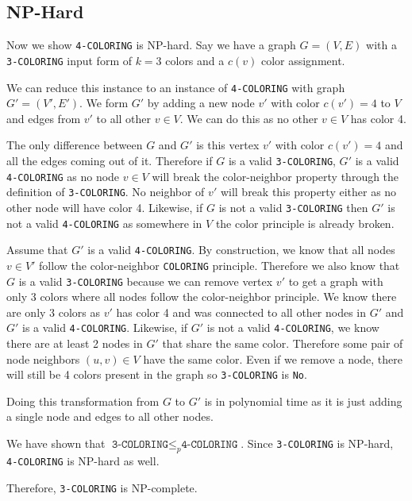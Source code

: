 \documentclass{article}
\begin{document}
\subsection{NP-Hard}
Now we show \texttt{4-COLORING} is NP-hard.
Say we have a graph $G = (V, E)$ with a \texttt{3-COLORING} input form of $k=3$ colors and a $c(v)$ color assignment.

We can reduce this instance to an instance of \texttt{4-COLORING} with graph $G' = (V', E')$.
We form $G'$ by adding a new node $v'$ with color $c(v') = 4$ to $V$ and edges from $v'$ to all other $v \in V$. We can do this as no other $v \in V$ has color 4.

The only difference between $G$ and $G'$ is this vertex $v'$ with color $c(v') = 4$ and all the edges coming out of it. 
Therefore if $G$ is a valid \texttt{3-COLORING}, $G'$ is a valid \texttt{4-COLORING} as no node $v \in V$ will break the color-neighbor property through the definition of \texttt{3-COLORING}.
No neighbor of $v'$ will break this property either as no other node will have color 4.
Likewise, if $G$ is not a valid \texttt{3-COLORING} then $G'$ is not a valid \texttt{4-COLORING} as somewhere in $V$ the color principle is already broken.

Assume that $G'$ is a valid \texttt{4-COLORING}. By construction, we know that all nodes $v \in V'$ follow the color-neighbor \texttt{COLORING} principle. 
Therefore we also know that $G$ is a valid \texttt{3-COLORING} because we can remove vertex $v'$ to get a graph with only 3 colors where all nodes follow the color-neighbor principle.
We know there are only 3 colors as $v'$ has color 4 and was connected to all other nodes in $G'$ and $G'$ is a valid \texttt{4-COLORING}.
Likewise, if $G'$ is not a valid \texttt{4-COLORING}, we know there are at least 2 nodes in $G'$ that share the same color.
Therefore some pair of node neighbors $(u, v) \in V$ have the same color. Even if we remove a node, there will still be 4 colors present in the graph so \texttt{3-COLORING} is \texttt{No}. 

Doing this transformation from $G$ to $G'$ is in polynomial time as it is just adding a single node and edges to all other nodes.

We have shown that $\texttt{3-COLORING} \leq_p \texttt{4-COLORING}$. Since \texttt{3-COLORING} is NP-hard, \texttt{4-COLORING} is NP-hard as well.

Therefore, \texttt{3-COLORING} is NP-complete.
\end{document}

